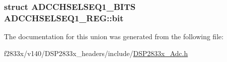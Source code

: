 \subsubsection[{bit}]{\setlength{\rightskip}{0pt plus 5cm}struct {\bf A\+D\+C\+C\+H\+S\+E\+L\+S\+E\+Q1\+\_\+\+B\+I\+T\+S} A\+D\+C\+C\+H\+S\+E\+L\+S\+E\+Q1\+\_\+\+R\+E\+G\+::bit}\label{union_a_d_c_c_h_s_e_l_s_e_q1___r_e_g_a50afc620712a83c81db033bfa4a431f7}


The documentation for this union was generated from the following file\+:\begin{DoxyCompactItemize}
\item 
f2833x/v140/\+D\+S\+P2833x\+\_\+headers/include/\hyperlink{_d_s_p2833x___adc_8h}{D\+S\+P2833x\+\_\+\+Adc.\+h}\end{DoxyCompactItemize}
